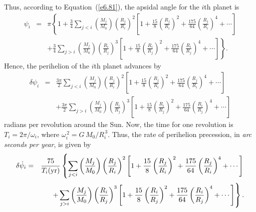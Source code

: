 Thus, according to Equation~(\ref{e6.81}), the apsidal angle for the $i$th planet is 
\begin{eqnarray}
\psi_i &=& \pi\left\{1 + \frac{3}{4}\sum_{j<i}\left(\frac{M_j}{M_0}\right)
\left(\frac{R_j}{R_i}\right)^2\left[1 + \frac{15}{8}\left(\frac{R_j}{R_i}\right)^2 + \frac{175}{64}\left(\frac{R_j}{R_i}
\right)^4+\cdots\right]\right.\nonumber\\[0.5ex]
&&\left.+ \frac{3}{4}\sum_{j>i}\left(\frac{M_j}{M_0}\right)
\left(\frac{R_i}{R_j}\right)^3\left[1 + \frac{15}{8}\left(\frac{R_i}{R_j}\right)^2 + \frac{175}{64}\left(\frac{R_i}{R_j}
\right)^4+\cdots\right]\right\}.
\end{eqnarray}
Hence, the perihelion of the $i$th planet advances by 
\begin{eqnarray}
\delta\psi_i &=& \frac{3\pi}{2}\sum_{j<i}\left(\frac{M_j}{M_0}\right)
\left(\frac{R_j}{R_i}\right)^2\left[1 + \frac{15}{8}\left(\frac{R_j}{R_i}\right)^2 + \frac{175}{64}\left(\frac{R_j}{R_i}
\right)^4+\cdots\right]\nonumber\\[0.5ex]
&&+ \frac{3\pi}{2}\sum_{j>i}\left(\frac{M_j}{M_0}\right)
\left(\frac{R_i}{R_j}\right)^3\left[1 + \frac{15}{8}\left(\frac{R_i}{R_j}\right)^2 + \frac{175}{64}\left(\frac{R_i}{R_j}
\right)^4+\cdots\right]
\end{eqnarray}
radians per revolution around the Sun. Now, the time for one revolution is $T_i = 2\pi/\omega_i$, where $\omega_i^{\,2} = G\,M_0/R_i^{\,3}$. Thus, the rate of perihelion precession, in {\em arc seconds per year}, is given by
\begin{eqnarray}
\delta\dot{\psi}_i &=& \frac{75}{T_i({\rm yr})}\left\{\sum_{j<i}\left(\frac{M_j}{M_0}\right)
\left(\frac{R_j}{R_i}\right)^2\left[1 + \frac{15}{8}\left(\frac{R_j}{R_i}\right)^2 + \frac{175}{64}\left(\frac{R_j}{R_i}
\right)^4+\cdots\right]\right.\nonumber\\[0.5ex]
&&\left.+ \sum_{j>i}\left(\frac{M_j}{M_0}\right)
\left(\frac{R_i}{R_j}\right)^3\left[1 + \frac{15}{8}\left(\frac{R_i}{R_j}\right)^2 + \frac{175}{64}\left(\frac{R_i}{R_j}
\right)^4+\cdots\right]\right\}.\label{e13.126}
\end{eqnarray}

